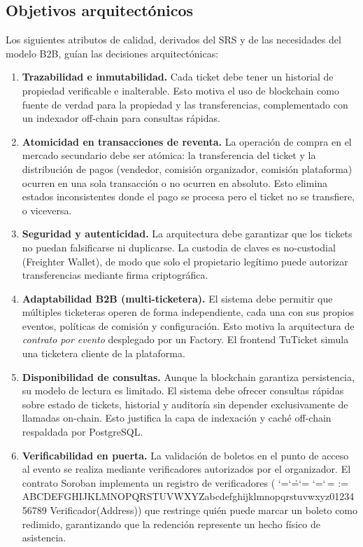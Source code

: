 \documentclass[12pt,oneside]{article}
\makeatletter
\def\ttbreak@uscore{\char95\penalty0\hskip0pt\relax}%
\def\ttbreak@actcat#1{\catcode`#1=\active}%
\def\ttbreak@chars{%
  \catcode`\/=\active \catcode`\.=\active \catcode`\:=\active
  \catcode`\-=\active \catcode`\,=\active
  \@tfor\ttbreak@c:=%
ABCDEFGHIJKLMNOPQRSTUVWXYZabcdefghijklmnopqrstuvwxyz0123456789\do{%
    \expandafter\ttbreak@actcat\ttbreak@c}%
  \let\_\ttbreak@uscore}%
\DeclareRobustCommand{\texttt}{\begingroup\ttfamily\ttbreak@chars\ttbreak@grab}
\def\ttbreak@grab#1{#1\endgroup}
\makeatother
\begin{document}
\subsection{Objetivos arquitectónicos}
\label{subsec:objetivos}

Los siguientes atributos de calidad, derivados del SRS y de las necesidades del modelo B2B, guían las decisiones arquitectónicas:

\begin{enumerate}
  \item \textbf{Trazabilidad e inmutabilidad.} Cada ticket debe tener un historial de propiedad verificable e inalterable. Esto motiva el uso de blockchain como fuente de verdad para la propiedad y las transferencias, complementado con un indexador off-chain para consultas rápidas.

  \item \textbf{Atomicidad en transacciones de reventa.} La operación de compra en el mercado secundario debe ser atómica: la transferencia del ticket y la distribución de pagos (vendedor, comisión organizador, comisión plataforma) ocurren en una sola transacción o no ocurren en absoluto. Esto elimina estados inconsistentes donde el pago se procesa pero el ticket no se transfiere, o viceversa.

  \item \textbf{Seguridad y autenticidad.} La arquitectura debe garantizar que los tickets no puedan falsificarse ni duplicarse. La custodia de claves es no-custodial (Freighter Wallet), de modo que solo el propietario legítimo puede autorizar transferencias mediante firma criptográfica.

  \item \textbf{Adaptabilidad B2B (multi-ticketera).} El sistema debe permitir que múltiples ticketeras operen de forma independiente, cada una con sus propios eventos, políticas de comisión y configuración. Esto motiva la arquitectura de \textit{contrato por evento} desplegado por un Factory. El frontend TuTicket simula una ticketera cliente de la plataforma.

  \item \textbf{Disponibilidad de consultas.} Aunque la blockchain garantiza persistencia, su modelo de lectura es limitado. El sistema debe ofrecer consultas rápidas sobre estado de tickets, historial y auditoría sin depender exclusivamente de llamadas on-chain. Esto justifica la capa de indexación y caché off-chain respaldada por PostgreSQL.

  \item \textbf{Verificabilidad en puerta.} La validación de boletos en el punto de acceso al evento se realiza mediante verificadores autorizados por el organizador. El contrato Soroban implementa un registro de verificadores (\texttt{Verificador(Address)}) que restringe quién puede marcar un boleto como redimido, garantizando que la redención represente un hecho físico de asistencia.
\end{enumerate}
\end{document}
